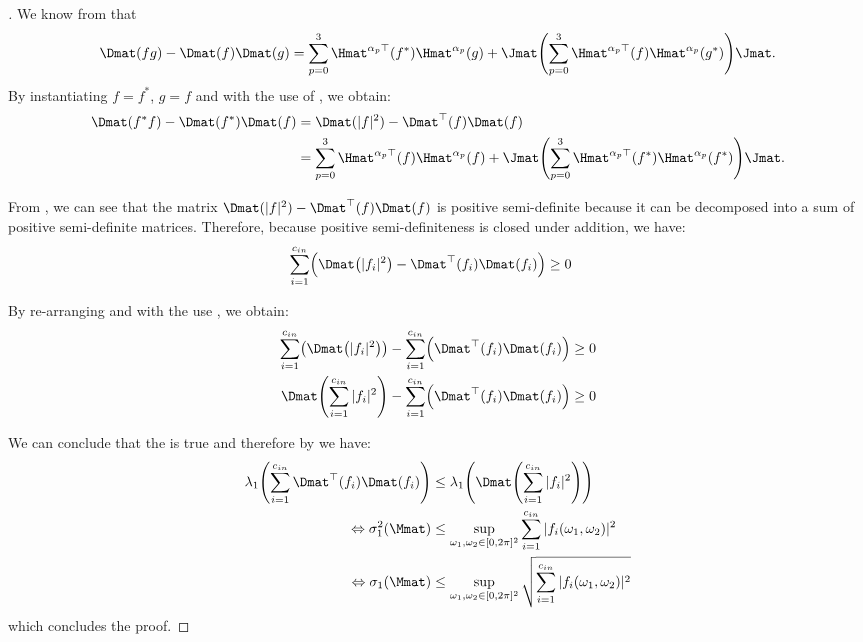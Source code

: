 \begin{proof}[]
We know from  that 
\begin{equation}
    \Dmat(fg) - \Dmat(f)\Dmat(g) = \sum_{p=0}^3 \Hmat^{\alpha_p \top}(f^*) \Hmat^{\alpha_p}(g) + \Jmat \left( \sum_{p=0}^3 \Hmat^{\alpha_p \top}(f) \Hmat^{\alpha_p}(g^*) \right) \Jmat.
\end{equation}
By instantiating $f = f^*$, $g = f$ and with the use of , we obtain:
\begin{align} \label{equation:widom_identity_block_topelitz}
  \Dmat(f^* f) - \Dmat(f^*)\Dmat(f)
  &= \Dmat(|f|^2) - \Dmat^{\top}(f)\Dmat(f) \\
  &= \sum_{p=0}^3 \Hmat^{\alpha_p \top}(f)\Hmat^{\alpha_p}(f) + \Jmat \left( \sum_{p=0}^3 \Hmat^{\alpha_p \top}(f^*)\Hmat^{\alpha_p} (f^*) \right) \Jmat .
\end{align}

From , we can see that the matrix $\Dmat(|f|^2) - \Dmat^{\top}(f)\Dmat(f)$
is positive semi-definite because it can be decomposed into a sum of positive semi-definite matrices.
Therefore, because positive semi-definiteness is closed under addition, we have:
\begin{align}
    \sum_{i=1}^{\cin} \leftmat \Dmat \left( |f_i|^2 \right) - \Dmat^{\top} \left(f_i \right) \Dmat (f_i) \rightmat &\geq 0
\end{align}

By re-arranging and with the use , we obtain:
\begin{align}
   \sum_{i=1}^{\cin} \leftmat \Dmat \left( |f_i|^2 \right) \rightmat - \sum_{i=1}^{\cin} \leftmat \Dmat^{\top} \left(f_i \right) \Dmat (f_i) \rightmat &\geq 0 \\
    \Dmat \left( \sum_{i=1}^{\cin} |f_i|^2 \right) - \sum_{i=1}^{\cin} \leftmat \Dmat^{\top} \left(f_i \right) \Dmat (f_i) \rightmat &\geq 0
\end{align}


We can conclude that the  is true and therefore by  we have:
\begin{align}
    \lambda_1 \left( \sum_{i=1}^{\cin} \Dmat^{\top} \left(f_i \right) \Dmat (f_i) \right) &\leq \lambda_1 \left( \Dmat \left( \sum_{i=1}^{\cin} |f_i|^2 \right) \right) \\
    \Leftrightarrow \sigma_1^2 \left( \Mmat \right) &\leq \sup_{\omega_1, \omega_2 \in [0, 2\pi]^2} \sum_{i=1}^{\cin} |f_i(\omega_1, \omega_2)|^2 \\
    \Leftrightarrow \sigma_1 \left( \Mmat \right) &\leq \sup_{\omega_1, \omega_2 \in [0, 2\pi]^2} \sqrt{ \sum_{i=1}^{\cin} |f_i(\omega_1, \omega_2)|^2 }
\end{align}
which concludes the proof. 
\end{proof}


